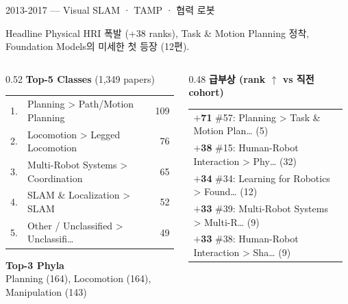 \documentclass[aspectratio=169,t]{beamer}
\newcommand{\hot}[1]{\textcolor{accentorange}{\textbf{#1}}}
\newcommand{\muted}[1]{\textcolor{mutedgray}{#1}}
\begin{document}
\begin{frame}{2013-2017 \quad — \quad Visual SLAM · TAMP · 협력 로봇}
\small
\begin{block}{Headline}
Physical HRI 폭발 (+38 ranks), Task \& Motion Planning 정착, Foundation Models의 미세한 첫 등장 (12편).
\end{block}
\vspace{4pt}

\begin{columns}[T,onlytextwidth]
\begin{column}{0.52\textwidth}
\textbf{Top-5 Classes} \muted{\scriptsize (1,349 papers)}\\[2pt]
\scriptsize
\begin{tabular}{@{}rlr@{}}
    1. & Planning > Path/Motion Planning & 109 \\
    2. & Locomotion > Legged Locomotion & 76 \\
    3. & Multi-Robot Systems > Coordination & 65 \\
    4. & SLAM \& Localization > SLAM & 52 \\
    5. & Other / Unclassified > Unclassifi… & 49 \\
\end{tabular}
\vspace{8pt}

\textbf{\small Top-3 Phyla}\\[2pt]
\scriptsize Planning (164), Locomotion (164), Manipulation (143)
\end{column}

\begin{column}{0.48\textwidth}
\textbf{급부상 (rank $\uparrow$ vs 직전 cohort)}\\[2pt]
\scriptsize
\begin{tabular}{@{}p{0.95\linewidth}@{}}
    \hot{$+$71} \#57: Planning > Task \& Motion Plan… (5) \\
    \hot{$+$38} \#15: Human-Robot Interaction > Phy… (32) \\
    \hot{$+$34} \#34: Learning for Robotics > Found… (12) \\
    \hot{$+$33} \#39: Multi-Robot Systems > Multi-R… (9) \\
    \hot{$+$33} \#38: Human-Robot Interaction > Sha… (9) \\
\end{tabular}
\end{column}
\end{columns}
\end{frame}
\end{document}
